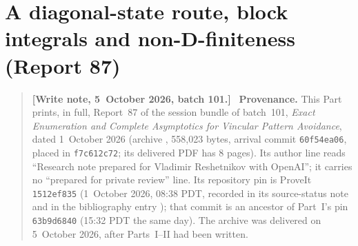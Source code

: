 \documentclass[11pt]{article}
\theoremstyle{remark}\newtheorem{remark}[theorem]{Remark}
\newenvironment{writenoteb}{\begin{quote}\small\raggedright\textbf{[Write note, 5~October 2026, batch 101.]}\ }{\end{quote}}
\begin{document}
\part{A diagonal-state route, block integrals and non-D-finiteness (Report 87)}
\label{vav:dg:part}
\begin{writenoteb}
\textbf{Provenance.} This Part prints, in full, Report~87 of the session
bundle of batch~101, \emph{Exact Enumeration and Complete Asymptotics for
Vincular Pattern Avoidance}, dated 1~October 2026 (archive
, 558{,}023 bytes,
arrival commit \texttt{60f54ea06}, placed in \texttt{f7c612c72}; its
delivered PDF has 8 pages). Its author line reads ``Research note prepared
for Vladimir Reshetnikov with OpenAI''; it carries no ``prepared for private
review'' line. Its repository pin is ProveIt \texttt{1512ef835}
(1~October 2026, 08:38 PDT, recorded in its source-status note and in the
bibliography entry \cite{proveitdg}); that commit is an ancestor of Part~I's
pin \texttt{63b9d6840} (15:32 PDT the same day). The archive was
delivered on 5~October 2026, after Parts~I--II had been written.


\end{writenoteb}
\end{document}
